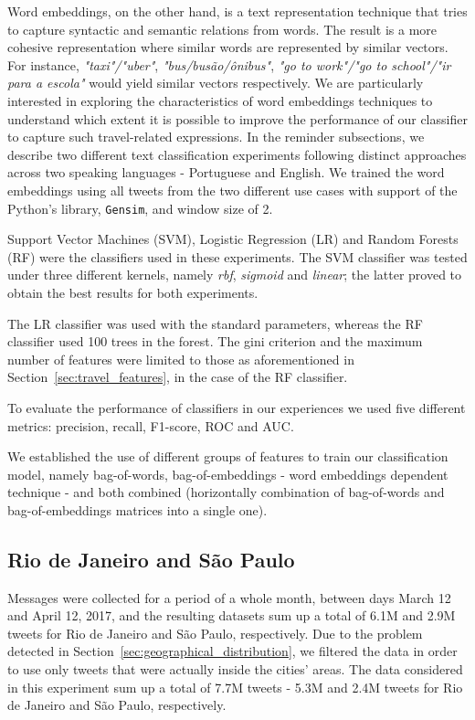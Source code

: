 Word embeddings, on the other hand, is a text representation technique that tries to capture syntactic and semantic relations from words. The result is a more cohesive representation where similar words are represented by similar vectors. For instance, \emph{"taxi"/"uber"}, \emph{"bus/busão/ônibus"}, \emph{"go to work"/"go to school"/"ir para a escola"} would yield similar vectors respectively.
We are particularly interested in exploring the characteristics of word embeddings techniques to understand which extent it is possible to improve the performance of our classifier to capture such travel-related expressions. In the reminder subsections, we describe two different text classification experiments following distinct approaches across two speaking languages - Portuguese and English. We trained the word embeddings using all tweets from the two different use cases with support of the Python's library, \texttt{Gensim}, and window size of 2.

Support Vector Machines (SVM), Logistic Regression (LR) and Random Forests (RF) were the classifiers used in these experiments. The SVM classifier was tested under three different kernels, namely \textit{rbf}, \textit{sigmoid} and \textit{linear}; the latter proved to obtain the best results for both experiments. 

The LR classifier was used with the standard parameters, whereas the RF classifier used 100 trees in the forest. The gini criterion and the maximum number of features were limited to those as aforementioned in Section~\ref{sec:travel_features}, in the case of the RF classifier.

To evaluate the performance of classifiers in our experiences we used five different metrics: precision, recall, F1-score, ROC and AUC.

We established the use of different groups of features to train our classification model, namely bag-of-words, bag-of-embeddings - word embeddings dependent technique - and both combined (horizontally combination of bag-of-words and bag-of-embeddings matrices into a single one).

\subsection{Rio de Janeiro and São Paulo}
\label{subsec:rio_de_janeiro_sao_paulo_experiment}

Messages were collected for a period of a whole month, between days March 12 and April 12, 2017, and the resulting datasets sum up a total of 6.1M and 2.9M tweets for Rio de Janeiro and São Paulo, respectively. Due to the problem detected in Section~\ref{sec:geographical_distribution}, we filtered the data in order to use only tweets that were actually inside the cities' areas. The data considered in this experiment sum up a total of 7.7M tweets -  5.3M and 2.4M tweets for Rio de Janeiro and São Paulo, respectively.


